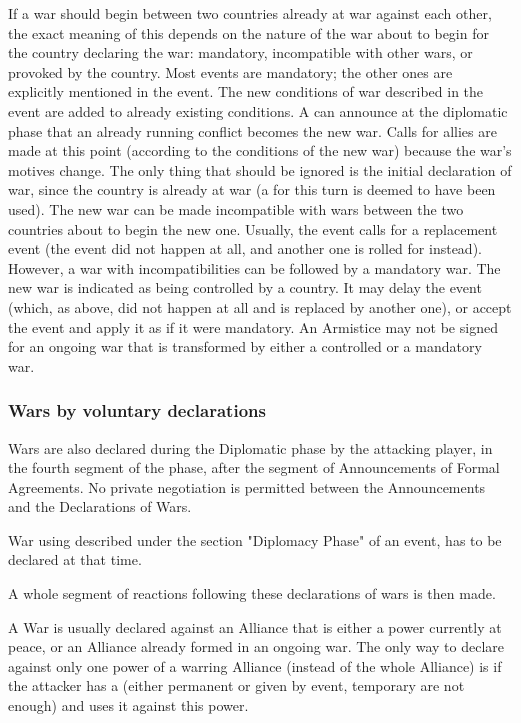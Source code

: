  If a war should begin between two
countries already at war against each other, the exact meaning of this depends
on the nature of the war about to begin for the country declaring the war:
mandatory, incompatible with other wars, or provoked by the country. Most
events are mandatory; the other ones are explicitly mentioned in the event.
 The new conditions of war described in the event are
added to already existing conditions. A \MAJ can announce at the diplomatic
phase that an already running conflict becomes the new war. Calls for allies
are made at this point (according to the conditions of the new war) because
the war's motives change. The only thing that should be ignored is the initial
declaration of war, since the country is already at war (a \CB for this turn
is deemed to have been used).
\bparag[Incompatibility] The new war can be made incompatible with wars
between the two countries about to begin the new one. Usually, the event calls
for a replacement event (the event did not happen at all, and another one is
rolled for instead). However, a war with incompatibilities can be followed by
a mandatory war.
 The new war is indicated as being controlled by a
country. It may delay the event (which, as above, did not happen at all and is
replaced by another one), or accept the event and apply it as if it were
mandatory.
\bparag[Armistices] An Armistice may not be signed for an ongoing war that is
transformed by either a controlled or a mandatory war.


\subsubsection{Wars by voluntary declarations}
\aparag Wars are also declared during the Diplomatic phase by the attacking
player, in the fourth segment of the phase, after the segment of Announcements
of Formal Agreements. No private negotiation is permitted between the
Announcements and the Declarations of Wars.

\aparag War using \CB described under the section "Diplomacy Phase" of an
event, has to be declared at that time.

\aparag A whole segment of reactions following these declarations of wars is
then made.

 A War is usually declared against an Alliance
that is either a power currently at peace, or an Alliance already formed in an
ongoing war.
\bparag The only way to declare against only one power of a warring Alliance
(instead of the whole Alliance) is if the attacker has a \CB (either permanent
or given by event, temporary \CB are not enough) and uses it against this
power.



